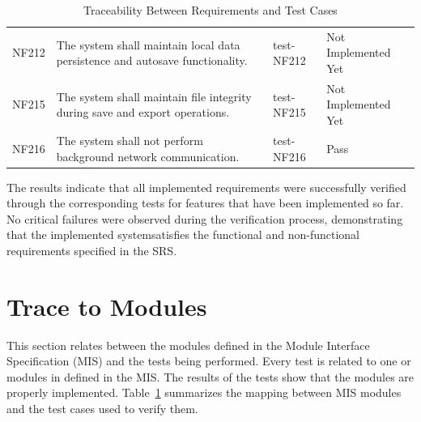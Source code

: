 \documentclass[12pt, titlepage]{article}
\begin{document}
\begin{table}[htbp]
\begin{tabular}{p{1.8cm} p{6.8cm} p{2.8cm} p{3.5cm}}
NF212 & The system shall maintain local data persistence and autosave functionality.
& test-NF212 & Not Implemented Yet \\

NF215 & The system shall maintain file integrity during save and export operations.
& test-NF215 & Not Implemented Yet \\

NF216 & The system shall not perform background network communication.
& test-NF216 & Pass \\

\bottomrule
\end{tabular}
\caption{Traceability Between Requirements and Test Cases}
\label{tab:reqTrace}
\end{table}

The results indicate that all implemented requirements were successfully
verified through the corresponding tests for features that have been implemented
so far. No critical failures were observed during the verification process,
demonstrating that the implemented systemsatisfies the functional and non-functional
requirements specified in the
SRS.

\vspace{25em}
\section{Trace to Modules}		
This section relates between the modules defined in the Module Interface Specification (MIS) and the tests being performed. Every test is related to one or modules in defined in the MIS. The results of the tests show that the modules are properly implemented. 
Table~\ref{tab:reqTrace} summarizes the mapping between MIS modules and
the test cases used to verify them. 
\end{document}

